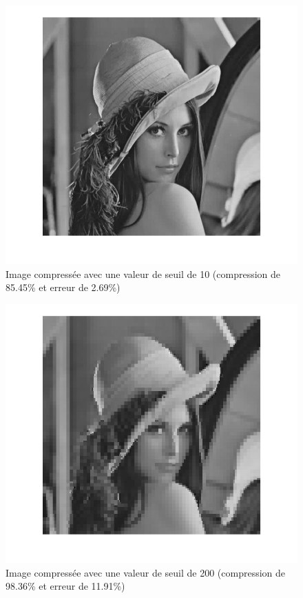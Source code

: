 \documentclass[12pt]{article}
\begin{document}
\begin{figure}[H]
	\centering
	\includegraphics[width = \textwidth]{images/3-2-seuil10}	\captionsetup{justification=centering}
	\caption{Image compressée avec une valeur de seuil de 10 (compression de 85.45\% et erreur de 2.69\%)}
	\label{compression10}
\end{figure}

\begin{figure}[H]
	\centering
	\includegraphics[width = \textwidth]{images/3-2-seuil200}	\captionsetup{justification=centering}
	\caption{Image compressée avec une valeur de seuil de 200 (compression de 98.36\% et erreur de 11.91\%)}
	\label{compression200}
\end{figure}
\end{document}
